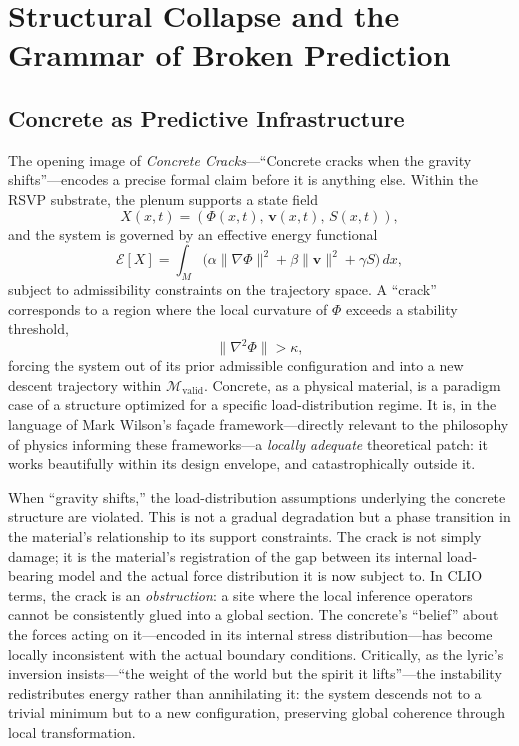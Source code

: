 \documentclass[12pt, a4paper]{article}
\begin{document}
\section{Structural Collapse and the Grammar of Broken Prediction}

\subsection{Concrete as Predictive Infrastructure}

The opening image of \textit{Concrete Cracks}---``Concrete cracks when the gravity shifts''---encodes a precise formal claim before it is anything else. Within the RSVP substrate, the plenum supports a state field
\[
X(x,t) = (\Phi(x,t),\, \mathbf{v}(x,t),\, S(x,t)),
\]
and the system is governed by an effective energy functional
\[
\mathcal{E}[X] = \int_M \bigl(\alpha\|\nabla\Phi\|^2 + \beta\|\mathbf{v}\|^2 + \gamma S\bigr)\,dx,
\]
subject to admissibility constraints on the trajectory space. A ``crack'' corresponds to a region where the local curvature of $\Phi$ exceeds a stability threshold,
\[
\|\nabla^2\Phi\| > \kappa,
\]
forcing the system out of its prior admissible configuration and into a new descent trajectory within $\mathcal{M}_{\text{valid}}$. Concrete, as a physical material, is a paradigm case of a structure optimized for a specific load-distribution regime. It is, in the language of Mark Wilson's fa\c{c}ade framework---directly relevant to the philosophy of physics informing these frameworks---a \textit{locally adequate} theoretical patch: it works beautifully within its design envelope, and catastrophically outside it.

When ``gravity shifts,'' the load-distribution assumptions underlying the concrete structure are violated. This is not a gradual degradation but a phase transition in the material's relationship to its support constraints. The crack is not simply damage; it is the material's registration of the gap between its internal load-bearing model and the actual force distribution it is now subject to. In CLIO terms, the crack is an \textit{obstruction}: a site where the local inference operators cannot be consistently glued into a global section. The concrete's ``belief'' about the forces acting on it---encoded in its internal stress distribution---has become locally inconsistent with the actual boundary conditions. Critically, as the lyric's inversion insists---``the weight of the world but the spirit it lifts''---the instability redistributes energy rather than annihilating it: the system descends not to a trivial minimum but to a new configuration, preserving global coherence through local transformation.
\end{document}
